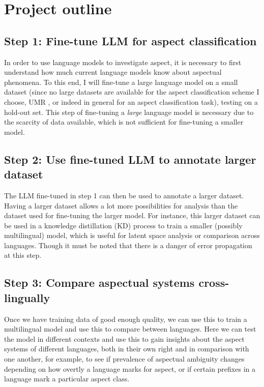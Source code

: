 \section{Project outline}
\subsection*{Step 1: Fine-tune LLM for aspect classification}
In order to use language models to investigate aspect, it is necessary to first understand how much current language models know about aspectual phenomena. To this end, I will fine-tune a large language model on a small dataset (since no large datasets are available for the aspect classification scheme I choose, UMR \citep{umr}, or indeed in general for an aspect classification task), testing on a hold-out set. This step of fine-tuning a \emph{large} language model is necessary due to the scarcity of data available, which is not sufficient for fine-tuning a smaller model.
\subsection*{Step 2: Use fine-tuned LLM to annotate larger dataset}
The LLM fine-tuned in step 1 can then be used to annotate a larger dataset. Having a larger dataset allows a lot more possibilities for analysis than the dataset used for fine-tuning the larger model. For instance, this larger dataset can be used in a knowledge distillation (KD) process to train a smaller (possibly multilingual) model, which is useful for latent space analysis or comparison across languages. Though it must be noted that there is a danger of error propagation at this step.
\subsection*{Step 3: Compare aspectual systems cross-lingually}
Once we have training data of good enough quality, we can use this to train a multilingual model and use this to compare between languages. Here we can test the model in different contexts and use this to gain insights about the aspect systems of different languages, both in their own right and in comparison with one another, for example, to see if prevalence of aspectual ambiguity changes depending on how overtly a language marks for aspect, or if certain prefixes in a language mark a particular aspect class.

